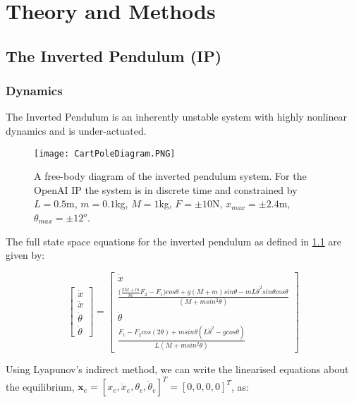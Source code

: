 \documentclass[../main.tex]{subfiles}
\begin{document}
\onlyinsubfile{\tableofcontents{}}

\chapter{Theory and Methods}

\section{The Inverted Pendulum (IP)}

\subsection{Dynamics}
The Inverted Pendulum is an inherently unstable system with highly nonlinear dynamics and is under-actuated.

\begin{figure}[ht]
    \centering
    \texttt{[image: CartPoleDiagram.PNG]}
    \caption{A free-body diagram of the inverted pendulum system. For the OpenAI IP the system is in discrete time and constrained by $L = 0.5$m, $m=0.1$kg, $M=1$kg, $F=\pm10$N, $x_{max}=\pm 2.4$m, $\theta_{max} = \pm 12^o$.}
    \label{fig:invpen}
\end{figure}

The full state space equations for the inverted pendulum as defined in \cref{fig:invpen} are given by:

\begin{equation}
\begin{bmatrix} \dot{x} \\ \ddot{x} \\ \dot{\theta} \\ \ddot{\theta} \end{bmatrix}  =
\begin{bmatrix} \dot{x} \\ \frac{\big(\frac{2M+m}{m}F_2-F_1\big)cos\theta + g(M+m)sin\theta - mL\dot{\theta}^2 sin\theta cos\theta}{(M + m sin^2\theta)} \\ \dot{\theta} \\ \frac{F_1 - F_2cos(2\theta)+ msin\theta(L\dot{\theta}^2-g cos\theta)}{L(M+m sin^2\theta)} \end{bmatrix}
\end{equation}

Using Lyapunov's indirect method, we can write the linearised equations about the equilibrium, $\boldsymbol{x}_e = [x_e, \dot{x}_e, \theta_e, \dot{\theta}_e]^T = [0, 0, 0, 0]^T$, as:
\end{document}
